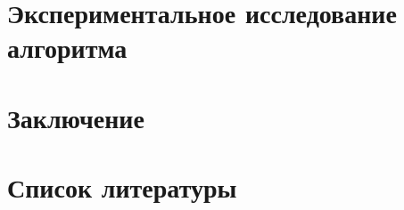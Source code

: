 \documentclass[12pt]{article}
\begin{document}
\newpage
\section{Экспериментальное исследование алгоритма}


\newpage
\section{Заключение}


\newpage
\section{Список литературы}
\end{document}
